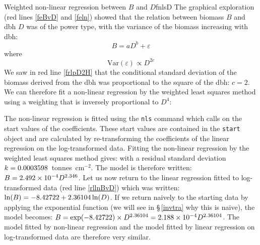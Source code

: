 \begin{filrouge}{Weighted non-linear regression between $B$ and $D$}{fnlsD}%
The graphical exploration (red lines \ref{feBvD} and \ref{feln}) showed that the relation between biomass $B$ and dbh $D$ was of the power type, with the variance of the biomass increasing with dbh:
\[
B=aD^b+\varepsilon
\]
where
\[
\mathrm{Var}(\varepsilon)\propto D^{2c}
\]
We saw in red line \ref{frlpD2H} that the conditional standard deviation of the biomass derived from the dbh was proportional to the square of the dbh: $c=2$. We can therefore fit a non-linear regression by the weighted least squares method using a weighting that is inversely proportional to $D^4$:

%
The non-linear regression is fitted using the \texttt{nls} command which calls on the start values of the coefficients. These start values are contained in the \texttt{start} object and are calculated by re-transforming the coefficients of the linear regression on the log-transformed data. Fitting the non-linear regression by the weighted least squares method gives:
%
with a residual standard deviation
$k=\mbox{0.0003598}$~tonnes~cm$^{-2}$. 
The model is therefore written: $B=\mbox{2.492}\times10^{-4}D^{2.346}$. Let us now return to the linear regression fitted to log-transformed data (red line \ref{rllnBvD}) which was written: $\ln(B)=-\mbox{8.42722}+\mbox{2.36104}\ln(D)$.
If we return naively to the starting data by applying the exponential function (we will see in \S\,\ref{invtra} why this is naive), the model becomes: $B=\exp(-\mbox{8.42722})\times
D^{2.36104}=\mbox{2.188}\times10^{-4}D^{2.36104}$. The model fitted by non-linear regression and the model fitted by linear regression on log-transformed data are therefore very similar.
\end{filrouge}

